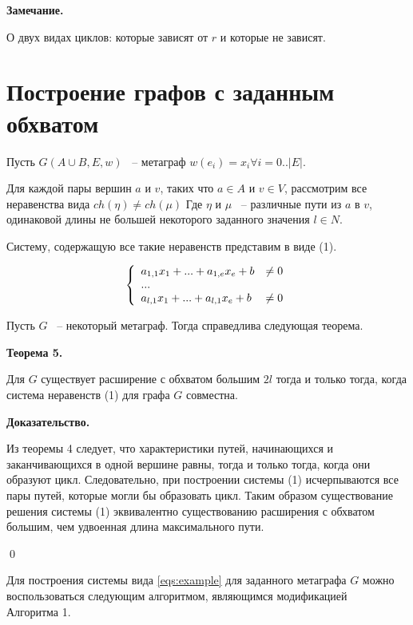 \documentclass[14pt]{mmcs-article}
\begin{document}
\textbf{Замечание.}


О двух видах циклов: которые зависят от $r$ и которые не зависят.

\pagebreak

\section{Построение графов с заданным обхватом}

Пусть $G(A \cup B, E, w)$ ~-- метаграф $w(e_i) = x_i \forall i = 0..|E|$.

Для каждой пары вершин $a$ и $v$, таких что $a \in A$ и $v \in V$, рассмотрим все неравенства вида $ch(\eta) \neq ch(\mu)$ Где $\eta$ и $\mu$ ~-- различные пути из $a$ в $v$, одинаковой длины не большей некоторого заданного значения $l \in N$.

Систему, содержащую все такие неравенств представим в виде (1).

\begin{equation}
    \centering
    \left\{
        \begin{array}{ll}
            a_{1,1} x_1 + ... + a_{1,e} x_e + b &\neq 0\\
            ...\\
            a_{l,1} x_1 + ... + a_{l,1} x_e + b &\neq 0\\
        \end{array}
    \right.
    \label{eqs:example}
\end{equation}

Пусть $G$ ~-- некоторый метаграф. Тогда справедлива следующая теорема.

\textbf{Теорема 5.}

Для $G$ существует расширение с обхватом большим $2l$  тогда и только тогда, когда система неравенств (1) для графа $G$ совместна.

\textbf{Доказательство.}

Из теоремы 4 следует, что характеристики путей, начинающихся и заканчивающихся в одной вершине равны, тогда и только тогда, когда они образуют цикл. Следовательно, при построении системы (1) исчерпываются все пары путей, которые могли бы образовать цикл. Таким образом существование решения системы (1) эквивалентно существованию расширения с обхватом большим, чем удвоенная длина максимального пути.

\qed

Для построения системы вида \ref{eqs:example} для заданного метаграфа $G$ можно воспользоваться следующим алгоритмом, являющимся модификацией\\ Алгоритма 1.
\end{document}
